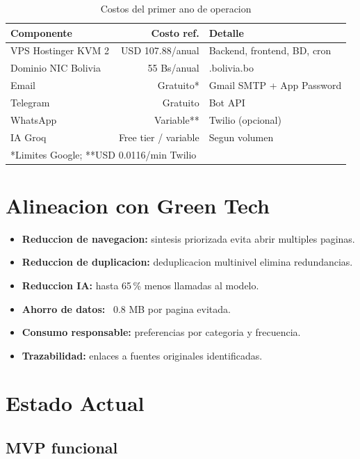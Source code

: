 \documentclass[12pt,oneside]{report}
\begin{document}
\begin{table}[H]
\centering
\begin{tabular}{lrl}
\toprule
\textbf{Componente} & \textbf{Costo ref.} & \textbf{Detalle} \\
\midrule
VPS Hostinger KVM 2 & USD 107.88/anual & Backend, frontend, BD, cron \\
Dominio NIC Bolivia & 55 Bs/anual & .bolivia.bo \\
Email & Gratuito* & Gmail SMTP + App Password \\
Telegram & Gratuito & Bot API \\
WhatsApp & Variable** & Twilio (opcional) \\
IA Groq & Free tier / variable & Segun volumen \\
\bottomrule
\multicolumn{3}{l}{*Limites Google; **USD 0.0116/min Twilio}
\end{tabular}
\caption{Costos del primer ano de operacion}
\end{table}

\chapter{Alineacion con Green Tech}

\begin{itemize}[nosep]
    \item \textbf{Reduccion de navegacion:} sintesis priorizada evita abrir multiples paginas.
    \item \textbf{Reduccion de duplicacion:} deduplicacion multinivel elimina redundancias.
    \item \textbf{Reduccion IA:} hasta 65\,\% menos llamadas al modelo.
    \item \textbf{Ahorro de datos:} ~0.8 MB por pagina evitada.
    \item \textbf{Consumo responsable:} preferencias por categoria y frecuencia.
    \item \textbf{Trazabilidad:} enlaces a fuentes originales identificadas.
\end{itemize}

\chapter{Estado Actual}

\section{MVP funcional}
\end{document}
